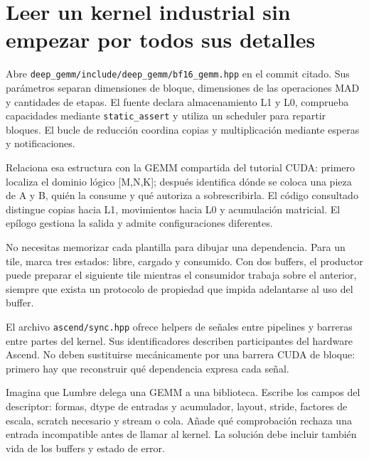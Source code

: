 \documentclass[12pt,a4paper,oneside]{report}
\begin{document}
\section{Leer un kernel industrial sin empezar por todos sus detalles}
Abre \texttt{deep\_gemm/in\allowbreak{}clude/deep\_g\allowbreak{}emm/bf16\_gem\allowbreak{}m.hpp} en el commit citado. Sus parámetros separan dimensiones de bloque, dimensiones de las operaciones MAD y cantidades de etapas. El fuente declara almacenamiento L1 y L0, comprueba capacidades mediante \texttt{static\_assert} y utiliza un scheduler para repartir bloques. El bucle de reducción coordina copias y multiplicación mediante esperas y notificaciones. \cite{deepgemm-bf16}

Relaciona esa estructura con la GEMM compartida del tutorial CUDA: primero localiza el dominio lógico [M,N,K]; después identifica dónde se coloca una pieza de A y B, quién la consume y qué autoriza a sobrescribirla. El código consultado distingue copias hacia L1, movimientos hacia L0 y acumulación matricial. El epílogo gestiona la salida y admite configuraciones diferentes. \cite{deepgemm-bf16}

No necesitas memorizar cada plantilla para dibujar una dependencia. Para un tile, marca tres estados: libre, cargado y consumido. Con dos buffers, el productor puede preparar el siguiente tile mientras el consumidor trabaja sobre el anterior, siempre que exista un protocolo de propiedad que impida adelantarse al uso del buffer.

\begin{center}
\end{center}
El archivo \texttt{ascend/sync.hpp} ofrece helpers de señales entre pipelines y barreras entre partes del kernel. Sus identificadores describen participantes del hardware Ascend. No deben sustituirse mecánicamente por una barrera CUDA de bloque: primero hay que reconstruir qué dependencia expresa cada señal. \cite{deepgemm-sync}

\begin{practica}
Imagina que Lumbre delega una GEMM a una biblioteca. Escribe los campos del descriptor: formas, dtype de entradas y acumulador, layout, stride, factores de escala, scratch necesario y stream o cola. Añade qué comprobación rechaza una entrada incompatible antes de llamar al kernel. La solución debe incluir también vida de los buffers y estado de error.

\end{practica}
\end{document}
